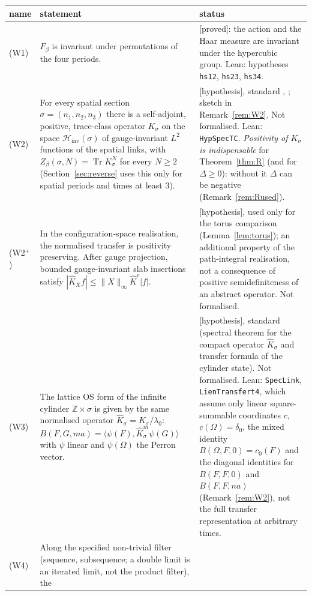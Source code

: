 \documentclass[11pt,a4paper]{article}
\theoremstyle{plain}
\theoremstyle{definition}
\theoremstyle{remark}
\numberwithin{equation}{section}
\newcommand{\Z}{\mathbb{Z}}
\newcommand{\Tr}{\operatorname{Tr}}
\newcommand{\Hinv}{\mathcal{H}_{\mathrm{inv}}}
\newcommand{\Kh}{\widehat K}
\newcommand{\st}[1]{\textsf{[#1]}}
\begin{document}
\begin{table}[ht]
\centering\footnotesize
\begin{tabular}{@{}>{\raggedright\arraybackslash}p{}>{\raggedright\arraybackslash}p{}%
>{\raggedright\arraybackslash}p{}@{}}
\toprule
name & statement & status \\
\midrule
(W1) & $F_\beta$ is invariant under permutations of the four periods. & \st{proved}: the action and the Haar measure are invariant
under the hypercubic group. Lean: hypotheses \texttt{hs12}, \texttt{hs23}, \texttt{hs34}.\\
(W2) & For every spatial section $\sigma=(n_1,n_2,n_3)$ there is a self-adjoint, positive, trace-class operator $K_\sigma$ on the space
$\Hinv(\sigma)$ of gauge-invariant $L^2$ functions of the spatial links, with $Z_\beta(\sigma,N)=\Tr K_\sigma^N$ for every $N\ge2$ (Section~\ref{sec:reverse} uses this only for spatial periods and times at least $3$). &
\st{hypothesis}, standard \cite{Lus77}, \cite[\S2.3, Thm.~2.1]{OS78}; sketch in Remark~\ref{rem:W2}. Not formalised. Lean:
\texttt{HypSpecTC}. \emph{Positivity of $K_\sigma$ is indispensable} for Theorem~\ref{thm:R} (and for $\Delta\ge0$): without it $\Delta$ can be negative (Remark~\ref{rem:Rused}).\\
(W2$^+$) & In the configuration-space realisation, the normalised transfer is positivity preserving. After gauge projection, bounded
gauge-invariant slab insertions satisfy $|\Kh_Xf|\le\|X\|_\infty\Kh^r|f|$. & \st{hypothesis}, used only for the torus comparison
(Lemma~\ref{lem:torus}); an additional property of the path-integral realisation, not a consequence of positive semidefiniteness of an abstract
operator. Not formalised.\\
(W3) & The lattice OS form of the infinite cylinder $\Z\times\sigma$ is given by the same normalised operator $\Kh_\sigma=K_\sigma/\lambda_0$:
$B(F,G,ma)=\langle\psi(F),\Kh_\sigma^m\psi(G)\rangle$ with $\psi$ linear and $\psi(\Omega)$ the Perron vector. & \st{hypothesis},
standard (spectral theorem for the compact operator $\Kh_\sigma$ and transfer formula of the cylinder state). Not formalised. Lean:
\texttt{SpecLink}, \texttt{LienTransfert4}, which assume only linear square-summable coordinates $c$, $c(\Omega)=\delta_0$, the mixed identity $B(\Omega,F,0)=c_0(F)$ and the diagonal identities for $B(F,F,0)$ and $B(F,F,na)$ (Remark~\ref{rem:W2}), not the full transfer representation at arbitrary times.\\
(W4) & Along the specified non-trivial filter (sequence, subsequence; a double limit is an iterated limit, not the product filter), the

\end{tabular}
\end{table}
\end{document}
